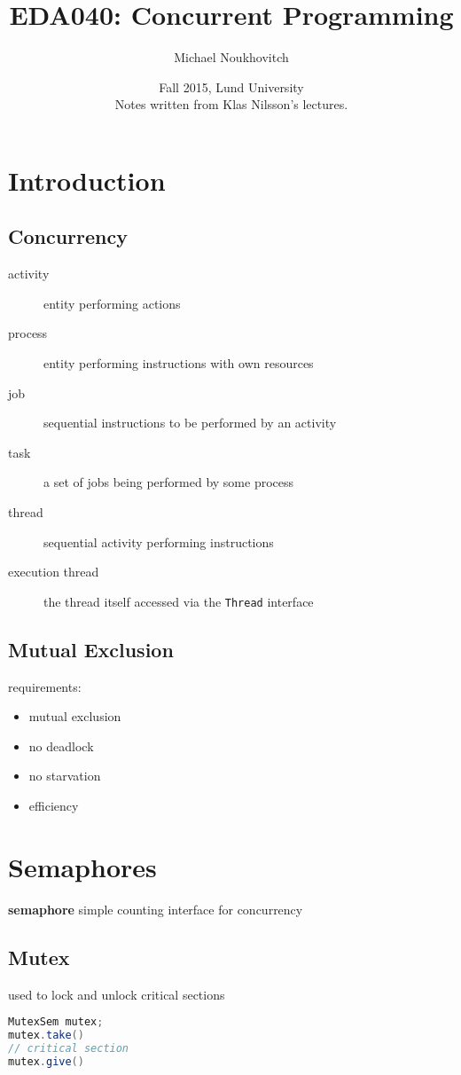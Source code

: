 \documentclass[]{article}
\theoremstyle{definition}
\begin{document}
	\let\ref\Cref

	\title{\bf{EDA040: Concurrent Programming}}
	\date{Fall 2015, Lund University\\ \center Notes written from Klas Nilsson's lectures.}
	\author{Michael Noukhovitch}

	\maketitle
	\newpage
	\tableofcontents
	\newpage

	\section{Introduction}
	\subsection{Concurrency}
	\begin{description}
		\item[activity] entity performing actions
		\item[process] entity performing instructions with own resources
		\item[job] sequential instructions to be performed by an activity
		\item[task] a set of jobs being performed by some process
		\item[thread] sequential activity performing instructions
		\item[execution thread] the thread itself accessed via the \lstinline|Thread| interface
	\end{description}

	\subsection{Mutual Exclusion}
	requirements:
	\begin{itemize}
		\item mutual exclusion
		\item no deadlock
		\item no starvation
		\item efficiency
	\end{itemize}
	\section{Semaphores}
	\textbf{semaphore} simple counting interface for concurrency
	\subsection{Mutex}
	used to lock and unlock critical sections
	\begin{lstlisting}[language=Java]
MutexSem mutex;
mutex.take()
// critical section
mutex.give()
	\end{lstlisting}
\end{document}
